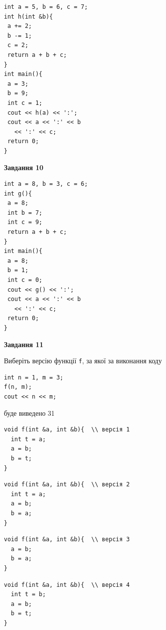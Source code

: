 \documentclass[12pt, ukrainian]{article}
\def\code#1{\Verb!#1!}
\begin{document}
{\begin {large}
\begin{minipage}[t]{7.0cm}
\begin{verbatim}
int a = 5, b = 6, c = 7;
int h(int &b){
 a += 2;
 b -= 1;
 c = 2;
 return a + b + c;
}
int main(){
 a = 3;
 b = 9;
 int c = 1;
 cout << h(a) << ':';
 cout << a << ':' << b 
   << ':' << c;
 return 0;
}
\end{verbatim}



\begin{center}
\textbf{Завдання 10}
\end{center}
\vspace{-8mm}

\begin{verbatim}
int a = 8, b = 3, c = 6;
int g(){
 a = 8;
 int b = 7;
 int c = 9;
 return a + b + c;
}
int main(){
 a = 8;
 b = 1;
 int c = 0;
 cout << g() << ':';
 cout << a << ':' << b 
   << ':' << c;
 return 0;
}
\end{verbatim}

\end{minipage}
\vline \hspace{1mm}
\begin{minipage}[t]{11.0cm}

\begin{center}
\textbf{Завдання 11}
\end{center}
Виберіть версію функції \code{f}, за якої за виконання коду
\begin{verbatim}
int n = 1, m = 3;
f(n, m);
cout << n << m;
\end{verbatim}

буде виведено 31

\begin{verbatim}
void f(int &a, int &b){  \\ версія 1
  int t = a;
  a = b;
  b = t;
}
\end{verbatim}

\vspace{-8mm}\begin{verbatim}
void f(int &a, int &b){  \\ версія 2
  int t = a;
  a = b;
  b = a;
}
\end{verbatim}

\vspace{-8mm}\begin{verbatim}
void f(int &a, int &b){  \\ версія 3
  a = b;
  b = a;
}
\end{verbatim}

\vspace{-8mm}\begin{verbatim}
void f(int &a, int &b){  \\ версія 4
  int t = b;
  a = b;
  b = t;
}
\end{verbatim}




\end{minipage}
\end{large}}
\end{document}
